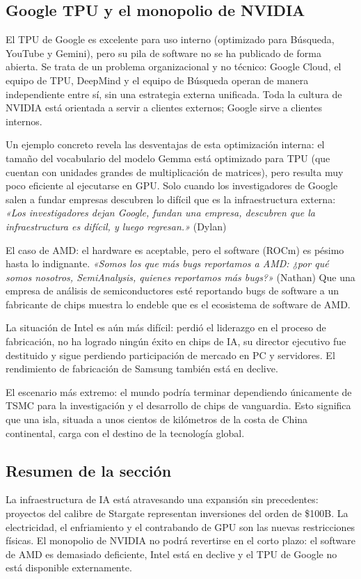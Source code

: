 \subsection{Google TPU y el monopolio de NVIDIA}

El TPU de Google es excelente para uso interno (optimizado para Búsqueda, YouTube y Gemini), pero su pila de software no se ha publicado de forma abierta. Se trata de un problema organizacional y no técnico: Google Cloud, el equipo de TPU, DeepMind y el equipo de Búsqueda operan de manera independiente entre sí, sin una estrategia externa unificada. Toda la cultura de NVIDIA está orientada a servir a clientes externos; Google sirve a clientes internos.

Un ejemplo concreto revela las desventajas de esta optimización interna: el tamaño del vocabulario del modelo Gemma está optimizado para TPU (que cuentan con unidades grandes de multiplicación de matrices), pero resulta muy poco eficiente al ejecutarse en GPU. Solo cuando los investigadores de Google salen a fundar empresas descubren lo difícil que es la infraestructura externa: \textit{«Los investigadores dejan Google, fundan una empresa, descubren que la infraestructura es difícil, y luego regresan.»} (Dylan)

El caso de AMD: el hardware es aceptable, pero el software (ROCm) es pésimo hasta lo indignante. \textit{«Somos los que más bugs reportamos a AMD: ¿por qué somos nosotros, SemiAnalysis, quienes reportamos más bugs?»} (Nathan) Que una empresa de análisis de semiconductores esté reportando bugs de software a un fabricante de chips muestra lo endeble que es el ecosistema de software de AMD.

La situación de Intel es aún más difícil: perdió el liderazgo en el proceso de fabricación, no ha logrado ningún éxito en chips de IA, su director ejecutivo fue destituido y sigue perdiendo participación de mercado en PC y servidores. El rendimiento de fabricación de Samsung también está en declive.

El escenario más extremo: el mundo podría terminar dependiendo únicamente de TSMC para la investigación y el desarrollo de chips de vanguardia. Esto significa que una isla, situada a unos cientos de kilómetros de la costa de China continental, carga con el destino de la tecnología global.

\subsection{Resumen de la sección}

La infraestructura de IA está atravesando una expansión sin precedentes: proyectos del calibre de Stargate representan inversiones del orden de \$100B. La electricidad, el enfriamiento y el contrabando de GPU son las nuevas restricciones físicas. El monopolio de NVIDIA no podrá revertirse en el corto plazo: el software de AMD es demasiado deficiente, Intel está en declive y el TPU de Google no está disponible externamente.
